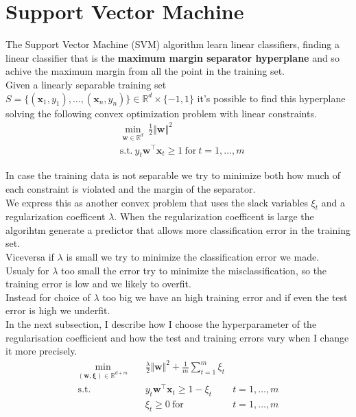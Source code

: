 \newpage
\section{Support Vector Machine}
The Support Vector Machine (SVM) algorithm learn linear classifiers, finding a linear classifier that is the \textbf{maximum margin separator hyperplane} and so achive the maximum margin from all the point in the training set.\\

Given a linearly separable training set $S = \{(\boldsymbol{x}_1, y_1), \dots, (\boldsymbol{x}_n, y_n)\} \in \mathbb{R}^d \times \{-1, 1\}$ it's possible to find this hyperplane solving the following convex optimization problem with linear constraints.\\ 
\begin{align*} 
    & \underset{\boldsymbol{w} \in \mathbb{R}^d}{\min} \ \frac{1}{2} \Vert \boldsymbol{w} \Vert^2 \\
    & \text{s.t.} \ y_t \boldsymbol{w}^\top \boldsymbol{x}_t \geq 1 \ \text{for} \ t = 1, \dots, m 
\end{align*}

In case the training data is not separable we try to minimize both how much of each constraint is violated and the margin of the separator.\\
We express this as another convex problem that uses the slack variables $\xi_t$ and a regularization coefficent $\lambda$.
When the regularization coefficent is large the algorihtm generate a predictor that allows more classification error in the training set.\\
Viceversa if $\lambda$ is small we try to minimize the classification error we made.\\
Usualy for $\lambda$ too small the error try to minimize the misclassification, so the training error is low and we likely to overfit.\\
Instead for choice of $\lambda$ too big we have an high training error and if even the test error is high we underfit. \\
In the next subsection, I describe how I choose the hyperparameter of the regularisation coefficient and how the test and training errors vary when I change it more precisely.\\ %

\begin{align*}
    \underset{(\boldsymbol{w}, \boldsymbol{\xi}) \in \mathbb{R}^{d+m}}{\min} \quad & \frac{\lambda}{2} \Vert \boldsymbol{w} \Vert^2 + \frac{1}{m} \sum_{t = 1}^m \xi_t \\
    \text{s.t.} \quad & y_t \boldsymbol{w}^\top \boldsymbol{x}_t \geq 1 - \xi_t & t = 1, \dots, m \\
    & \xi_t \geq 0 \ \text{for} & t = 1, \dots, m
\end{align*}

